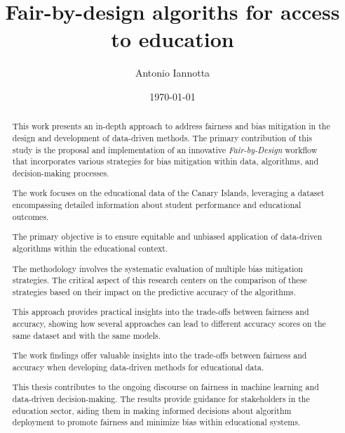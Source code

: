 \documentclass[12pt,a4paper,openright,twoside]{book}
\title{Fair-by-design algoriths for access to education}
\author{Antonio Iannotta}
\date{\today}
\begin{document}
	
\frontmatter



\begin{abstract}

    This work presents an in-depth approach to address fairness and bias mitigation in the design and development of data-driven methods. The primary contribution of this study is the proposal and implementation of an innovative \emph{Fair-by-Design} workflow that incorporates various strategies for bias mitigation within data, algorithms, and decision-making processes.

    The work focuses on the educational data of the Canary Islands, leveraging a dataset encompassing detailed information about student performance and educational outcomes.

    The primary objective is to ensure equitable and unbiased application of data-driven algorithms within the educational context. 

    The methodology involves the systematic evaluation of multiple bias mitigation strategies. The critical aspect of this research centers on the comparison of these strategies based on their impact on the predictive accuracy of the algorithms. 

    This approach provides practical insights into the trade-offs between fairness and accuracy, showing how several approaches can lead to different accuracy scores on the same dataset and with the same models. 

    The work findings offer valuable insights into the trade-offs between fairness and accuracy when developing data-driven methods for educational data. 

    This thesis contributes to the ongoing discourse on fairness in machine learning and data-driven decision-making. The results provide guidance for stakeholders in the education sector, aiding them in making informed decisions about algorithm deployment to promote fairness and minimize bias within educational systems. 

\end{abstract}
    



\tableofcontents   
\end{document}
